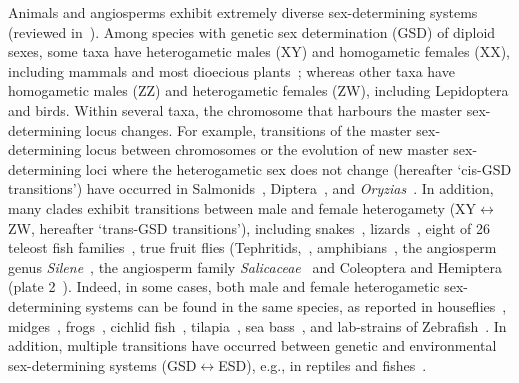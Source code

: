 \documentclass[10pt,letterpaper]{article}
\begin{document}
Animals and angiosperms exhibit extremely diverse sex-determining systems (reviewed in~\cite{Bull:1983vi,Charlesworth:2010it,Beukeboom:2014vb,Bachtrog:2014bx}). 
Among species with genetic sex determination (GSD) of diploid sexes, some taxa have heterogametic males (XY) and homogametic females (XX), including %
mammals and most dioecious plants~\cite{Ming:2011iy}; whereas other taxa have homogametic males (ZZ) and heterogametic females (ZW), including Lepidoptera and birds. 
Within several taxa, the chromosome that harbours the master sex-determining locus changes. 
For example, transitions of the master sex-determining locus between chromosomes or the evolution of new master sex-determining loci where the heterogametic sex does not change (hereafter `cis-GSD transitions') have occurred in Salmonids~\cite{Li:2011fm,Yano:2012di}, Diptera~\cite{Vicoso:2015hf}, and \textit{Oryzias}~\cite{Myosho:2012fv}. 
In addition, many clades exhibit transitions between male and female heterogamety (XY$\leftrightarrow$ZW, hereafter `trans-GSD transitions'), including snakes~\cite{Gamble2017}, lizards~\cite{Ezaz:2009tk}, eight of 26 teleost fish families~\cite{Mank:2006bt}, true fruit flies (Tephritids,~\cite{Vicoso:2015hf}, amphibians~\cite{Hillis:1990gu}, the angiosperm genus \textit{Silene}~\cite{Slancarova:2013dq}, the angiosperm family \textit{Salicaceae}~\cite{Pucholt2015,Pucholt2017} and Coleoptera and Hemiptera (plate 2~\cite{Beukeboom:2014vb}).
Indeed, in some cases, both male and female heterogametic sex-determining systems can be found in the same species, as reported in houseflies~\cite{Macdonald1978}, midges~\cite{Thompson1971}, frogs~\cite{Ogata:2007jm}, cichlid fish~\cite{Ser:2010iq}, tilapia~\cite{Lee2004}, sea bass~\cite{Vandeputte2007}, and lab-strains of Zebrafish~\cite{Liew2012,Wilson2014}.
In addition, multiple transitions have occurred between genetic and environmental sex-determining systems (GSD$\leftrightarrow$ESD), e.g., in reptiles and fishes~\cite{Conover:1987in,Mank:2006bt,Pokorna:2009ui,Ezaz:2009tk,Pen:2010kk,Holleley:2015hc}.
\end{document}
